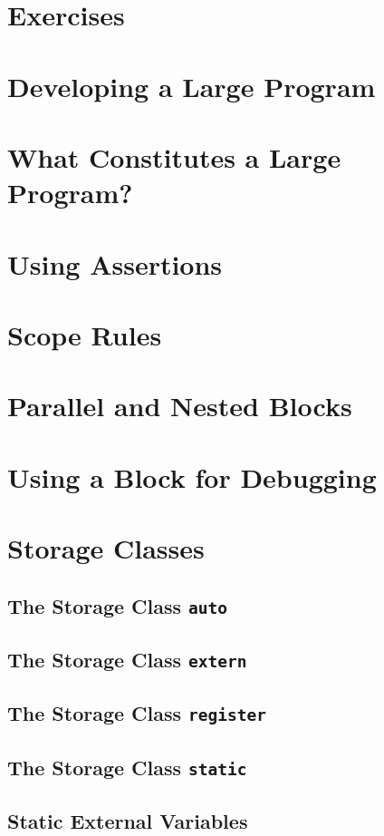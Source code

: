 \documentclass[12pt]{book}
\begin{document}
\section{Exercises}

\section{Developing a Large Program}

\section{What Constitutes a Large Program?}
\section{Using Assertions}
\section{Scope Rules}
\section{Parallel and Nested Blocks}
\section{Using a Block for Debugging}
\section{Storage Classes}
\subsection{The Storage Class \texttt{auto}}
\subsection{The Storage Class \texttt{extern}}
\subsection{The Storage Class \texttt{register}}
\subsection{The Storage Class \texttt{static}}
\subsection{Static External Variables}
\end{document}
